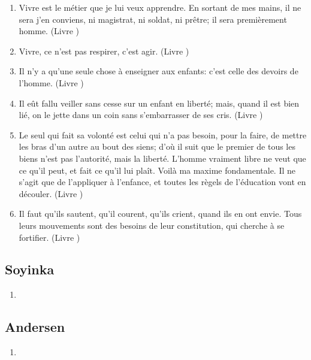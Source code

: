 \documentclass[a4paper, 11pt, hidelinks]{article}
\newcommand{\rb}[1]{\Romanbar{#1}}
\begin{document}
\begin{enumerate}
    \item Vivre est le métier que je lui veux apprendre. En sortant de mes mains, il ne sera j'en conviens, ni magistrat, ni soldat, ni prêtre; il sera premièrement homme. (Livre \rb{1})
    \item Vivre, ce n'est pas respirer, c'est agir. (Livre \rb{1})
    \item Il n'y a qu'une seule chose à enseigner aux enfants: c'est celle des devoirs de l'homme. (Livre \rb{1})
    \item Il eût fallu veiller sans cesse sur un enfant en liberté; mais, quand il est bien lié, on le jette dans un coin sans s'embarrasser de ses cris. (Livre \rb{69})
    \item Le seul qui fait sa volonté est celui qui n'a pas besoin, pour la faire, de mettre les bras d'un autre au bout des siens; d'où il suit que le premier de tous les biens n'est pas l'autorité, mais la liberté. L'homme vraiment libre ne veut que ce qu'il peut, et fait ce qu'il lui plaît. Voilà ma maxime fondamentale. Il ne s'agit que de l'appliquer à l'enfance, et toutes les règels de l'éducation vont en découler. (Livre \rb{2})  
    \item Il faut qu'ils sautent, qu'il courent, qu'ils crient, quand ils en ont envie. Tous leurs mouvements sont des besoins de leur constitution, qui cherche à se fortifier. (Livre \rb{2})
\end{enumerate}



\subsection{Soyinka}


\begin{enumerate}
    \item 
\end{enumerate}




\subsection{Andersen}


\begin{enumerate}
    \item 
\end{enumerate}
\end{document}
